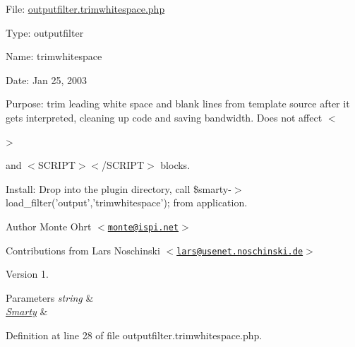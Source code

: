 \-File\-: \hyperlink{outputfilter_8trimwhitespace_8php}{outputfilter.\-trimwhitespace.\-php}\par
 \-Type\-: outputfilter\par
 \-Name\-: trimwhitespace\par
 \-Date\-: \-Jan 25, 2003\par
 \-Purpose\-: trim leading white space and blank lines from template source after it gets interpreted, cleaning up code and saving bandwidth. \-Does not affect $<$
\begin{DoxyPre}>\end{DoxyPre}
 and $<$\-S\-C\-R\-I\-P\-T$>$$<$/\-S\-C\-R\-I\-P\-T$>$ blocks.\par
 \-Install\-: \-Drop into the plugin directory, call {\ttfamily \$smarty-\/$>$load\-\_\-filter('output','trimwhitespace');} from application. \begin{DoxyAuthor}{\-Author}
\-Monte \-Ohrt $<$\href{mailto:monte@ispi.net}{\tt monte@ispi.\-net}$>$ 

\-Contributions from \-Lars \-Noschinski $<$\href{mailto:lars@usenet.noschinski.de}{\tt lars@usenet.\-noschinski.\-de}$>$ 
\end{DoxyAuthor}
\begin{DoxyVersion}{\-Version}
1. 
\end{DoxyVersion}

\begin{DoxyParams}{\-Parameters}
{\em string} & \\
\hline
{\em \hyperlink{class_smarty}{\-Smarty}} & \\
\hline
\end{DoxyParams}


\-Definition at line 28 of file outputfilter.\-trimwhitespace.\-php.


